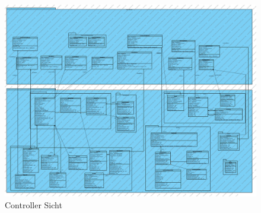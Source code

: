 \documentclass[fontsize=12pt,paper=a4,twoside]{scrartcl}
\begin{document}
\begin{figure}[H]
\begin{center}
 \includegraphics[width=\textwidth]{../GT_Modulsicht/PDFs/View-Subdiagramm_UI.pdf}
  \caption{Controller Sicht}
  \label{fig:boat1}
\end{center}
\end{figure}
\end{document}
